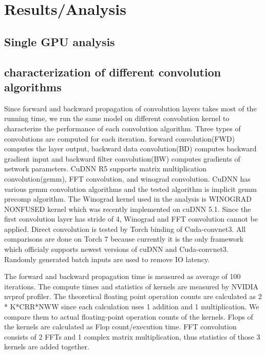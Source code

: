 \section{Results/Analysis}

\subsection{Single GPU analysis}


\subsection{characterization of different convolution algorithms}
Since forward and backward propagation of convolution layers takes most of the running time, we run the same model on different convolution kernel to characterize the performance of each convolution algorithm.
Three types of convolutions are computed for each iteration.
forward convolution(FWD) computes the layer output, backward data convolution(BD) computes backward gradient input and backward filter convolution(BW) computes gradients of network parameters.
CuDNN R5 supports matrix multiplication convolution(gemm), FFT convolution, and winograd convolution.
CuDNN has various gemm convolution algorithms and the tested algorithm is implicit gemm precomp algorithm.
The Winograd kernel used in the analysis is WINOGRAD NONFUSED kernel which was recently implemented  on cuDNN 5.1.
Since the first convolution layer has stride of 4, Winograd and FFT convolution cannot be applied.
Direct convolution is tested by Torch binding of Cuda-convnet3.
All comparisons are done on Torch 7 because currently it is the only framework which officialy supports newest versions of cuDNN and Cuda-convnet3.
Randomly generated batch inputs are used to remove IO latency.

The forward and backward propagation time is measured as average of 100 iterations.
The compute times and statistics of kernels are measured by NVIDIA nvprof profiler.
The theoretical floating point operation counts are calculated as 2 * K*CRR*NWW since each calculation uses 1 addition and 1 multiplication.
We compare them to actual floating-point operation counts of the kernels.
Flops of the kernels are calculated as Flop count/execution time.
FFT convolution consists of 2 FFTs and 1 complex matrix multiplication, thus statistics of those 3 kernels are added together.

